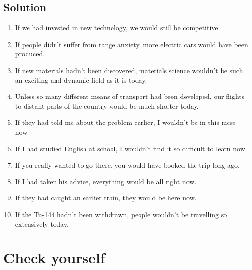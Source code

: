 \subsection*{Solution}
\begin{enumerate}
      \item If we had invested in new technology, we would still be competitive.
      \item If people didn’t suffer from range anxiety, more electric cars would have been produced.
      \item If new materials hadn’t been discovered, materials science wouldn’t be such an exciting and dynamic field as it is today.
      \item Unless so many different means of transport had been developed, our flights to distant parts of the country would be much shorter today.
      \item If they had told me about the problem earlier, I wouldn’t be in this mess now.
      \item If I had studied English at school, I wouldn’t find it so difficult to learn now.
      \item If you really wanted to go there, you would have booked the trip long ago.
      \item If I had taken his advice, everything would be all right now.
      \item If they had caught an earlier train, they would be here now.
      \item If the Tu-144 hadn’t been withdrawn, people wouldn’t be travelling so extensively today.
\end{enumerate}

\section{Check yourself}

